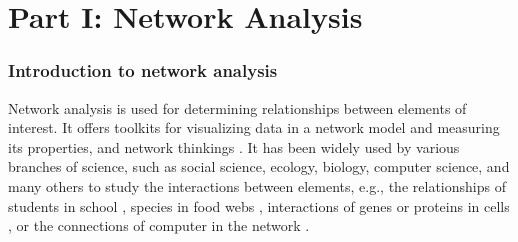 \section*{Part I: Network Analysis}

\subsubsection{Introduction to network analysis}
Network analysis is used for determining relationships between elements of interest. It offers toolkits for visualizing data in a network model and measuring its properties, and network thinkings . It has been widely used by various branches of science, such as social science, ecology, biology, computer science, and many others to study the interactions between elements, e.g., the relationships of students in school , species in food webs , interactions of genes or proteins in cells , or the connections of computer in the network .

